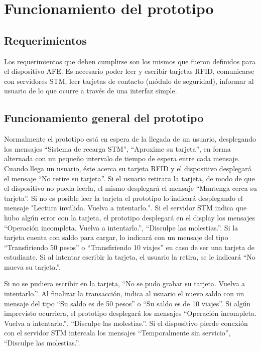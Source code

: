 \chapter{Funcionamiento del prototipo}

\section{Requerimientos}
Los requerimientos que deben cumplirse son los mismos que fueron definidos para el dispositivo AFE.
Es necesario poder leer y escribir tarjetas RFID, comunicarse con servidores STM, leer tarjetas de contacto (módulo de seguridad), informar al usuario de lo que ocurre a través de una interfaz simple.

\section{Funcionamiento general del prototipo}
Normalmente el prototipo está en espera de la llegada de un usuario, desplegando los
mensajes “Sistema de recarga STM”, “Aproxime su tarjeta”, en forma alternada con un
pequeño intervalo de tiempo de espera entre cada mensaje.
Cuando llega un usuario, éste acerca su tarjeta RFID y el dispositivo desplegará el mensaje
“No retire su tarjeta”. Si el usuario retirara la tarjeta, de modo de que el dispositivo no pueda
leerla, el mismo desplegará el mensaje “Mantenga cerca su tarjeta”. Si no es posible leer la
tarjeta el prototipo lo indicará desplegando el mensaje "Lectura inválida. Vuelva a
intentarlo.".
Si el servidor STM indica que hubo algún error con la tarjeta, el prototipo desplegará en el
display los mensajes “Operación incompleta. Vuelva a intentarlo.”, “Disculpe las
molestias.”.
Si la tarjeta cuenta con saldo para cargar, lo indicará con un mensaje del tipo “Transfiriendo
50 pesos” o “Transfiriendo 10 viajes” en caso de ser una tarjeta de estudiante.
Si al intentar escribir la tarjeta, el usuario la retira, se le indicará “No mueva su tarjeta.”.

Si no se pudiera escribir en la tarjeta, “No se pudo grabar su tarjeta. Vuelva a intentarlo.”.
Al finalizar la transacción, indica al usuario el nuevo saldo con un mensaje del tipo “Su
saldo es de 50 pesos” o “Su saldo es de 10 viajes”.
Si algún imprevisto ocurriera, el prototipo desplegará los mensajes “Operación incompleta.
Vuelva a intentarlo.”, “Disculpe las molestias.”.
Si el dispositivo pierde conexión con el servidor STM intercala los mensajes
“Temporalmente sin servicio”, “Disculpe las molestias.”.

